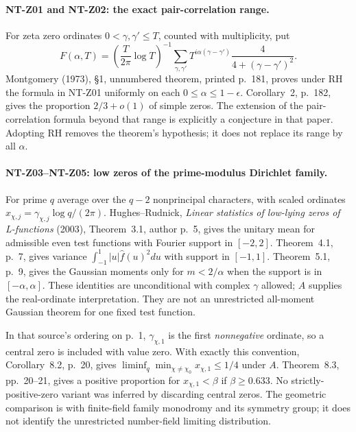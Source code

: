 \documentclass[11pt,a4paper]{article}
\begin{document}
\paragraph{NT-Z01 and NT-Z02: the exact pair-correlation range.}
For zeta zero ordinates $0<\gamma,\gamma'\le T$, counted with
multiplicity, put
\[
 F(\alpha,T)=\left(\frac{T}{2\pi}\log T\right)^{-1}
 \sum_{\gamma,\gamma'}T^{i\alpha(\gamma-\gamma')}
                    \frac4{4+(\gamma-\gamma')^2}.
\]
Montgomery (1973), \S1, unnumbered theorem, printed p.~181, proves under
RH the formula in NT-Z01 uniformly on each $0\le\alpha\le1-\epsilon$.
Corollary~2, p.~182, gives the proportion $2/3+o(1)$ of simple zeros.
The extension of the pair-correlation formula beyond that range is
explicitly a conjecture in that paper.  Adopting RH removes the theorem's
hypothesis; it does not replace its range by all $\alpha$.

\paragraph{NT-Z03--NT-Z05: low zeros of the prime-modulus Dirichlet family.}
For prime $q$ average over the $q-2$ nonprincipal characters, with scaled
ordinates $x_{\chi,j}=\gamma_{\chi,j}\log q/(2\pi)$.
Hughes--Rudnick, \emph{Linear statistics of low-lying zeros of
L-functions} (2003), Theorem~3.1, author p.~5, gives the unitary mean for
admissible even test functions with Fourier support in $[-2,2]$.
Theorem~4.1, p.~7, gives variance
$\int_{-1}^1|u|\widehat f(u)^2du$ with support in $[-1,1]$.
Theorem~5.1, p.~9, gives the Gaussian moments only for
$m<2/\alpha$ when the support is in $[-\alpha,\alpha]$.
These identities are unconditional with complex $\gamma$ allowed;
$A$ supplies the real-ordinate interpretation.  They are not an
unrestricted all-moment Gaussian theorem for one fixed test function.

In that source's ordering on p.~1, $\gamma_{\chi,1}$ is the first
\emph{nonnegative} ordinate, so a central zero is included with value zero.
With exactly this convention, Corollary~8.2, p.~20, gives
$\liminf_q\min_{\chi\ne\chi_0}x_{\chi,1}\le1/4$ under $A$.
Theorem~8.3, pp.~20--21, gives a positive proportion for
$x_{\chi,1}<\beta$ if $\beta\ge0.633$.
No strictly-positive-zero variant was inferred by discarding central
zeros.  The geometric comparison is with finite-field family monodromy
and its symmetry group; it does not identify the unrestricted
number-field limiting distribution.
\end{document}

